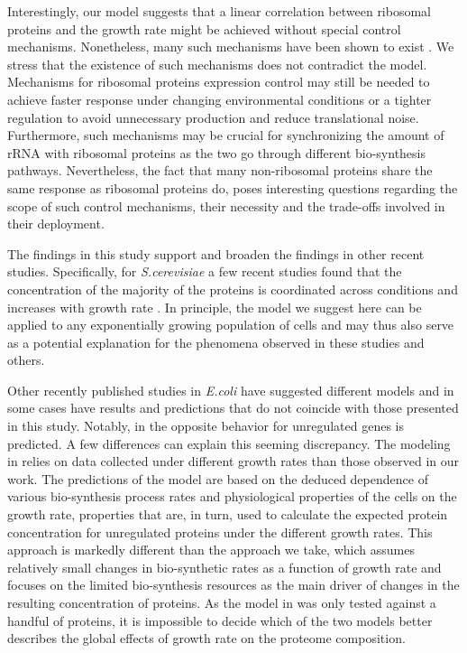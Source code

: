 \documentclass[a4paper]{article}
\begin{document}
Interestingly, our model suggests that a linear correlation between ribosomal proteins and the growth rate might be achieved without special control mechanisms.
Nonetheless, many such mechanisms have been shown to exist \cite{Nomura1984,25149558}.
We stress that the existence of such mechanisms does not contradict the model.
Mechanisms for ribosomal proteins expression control may still be needed to achieve faster response under changing environmental conditions or a tighter regulation to avoid unnecessary production and reduce translational noise.
Furthermore, such mechanisms may be crucial for synchronizing the amount of rRNA with ribosomal proteins as the two go through different bio-synthesis pathways.
Nevertheless, the fact that many non-ribosomal proteins share the same response as ribosomal proteins do, poses interesting questions regarding the scope of such control mechanisms, their necessity and the trade-offs involved in their deployment.

The findings in this study support and broaden the findings in other recent studies.
Specifically, for \emph{S.cerevisiae} a few recent studies found that the concentration of the majority of the proteins is coordinated across conditions and increases with growth rate \cite{Keren2013a,Gasch2000,Brauer2008a}.
In principle, the model we suggest here can be applied to any exponentially growing population of cells and may thus also serve as a potential explanation for the phenomena observed in these studies and others.

Other recently published studies in \emph{E.coli} have suggested different models and in some cases have results  and predictions that do not coincide with those presented in this study.
Notably, in \cite{Klumpp2009a} the opposite behavior for unregulated genes is predicted.
A few differences can explain this seeming discrepancy.
The modeling in \cite{Klumpp2009a} relies on data collected under different growth rates than those observed in our work.
The predictions of the model are based on the deduced dependence of various bio-synthesis process rates and physiological properties of the cells on the growth rate, properties that are, in turn, used to calculate the expected protein concentration for unregulated proteins under the different growth rates.
This approach is markedly different than the approach we take, which assumes relatively small changes in bio-synthetic rates as a function of growth rate and focuses on the limited bio-synthesis resources as the main driver of changes in the resulting concentration of proteins.
As the model in \cite{Klumpp2009a} was only tested against a handful of proteins, it is impossible to decide which of the two models better describes the global effects of growth rate on the proteome composition.
\end{document}
